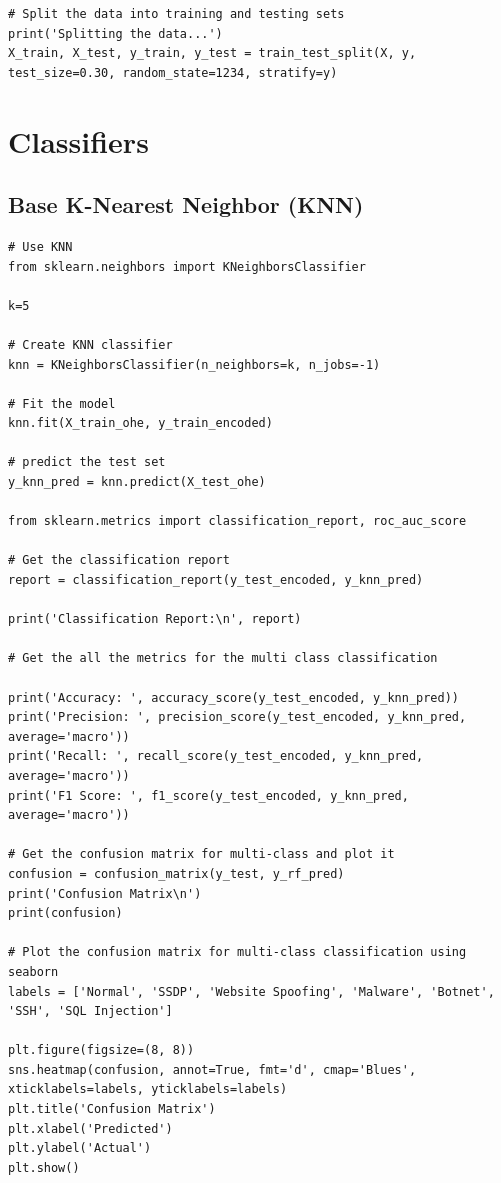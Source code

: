 \begin{appendices}
\begin{lstlisting}
# Split the data into training and testing sets
print('Splitting the data...')
X_train, X_test, y_train, y_test = train_test_split(X, y, test_size=0.30, random_state=1234, stratify=y)
\end{lstlisting}

\newpage
\section{Classifiers}
\label{appx: Classifiers}

\subsection{Base K-Nearest Neighbor (KNN)}
\begin{lstlisting}
# Use KNN
from sklearn.neighbors import KNeighborsClassifier

k=5

# Create KNN classifier
knn = KNeighborsClassifier(n_neighbors=k, n_jobs=-1)

# Fit the model
knn.fit(X_train_ohe, y_train_encoded)

# predict the test set
y_knn_pred = knn.predict(X_test_ohe)

from sklearn.metrics import classification_report, roc_auc_score

# Get the classification report
report = classification_report(y_test_encoded, y_knn_pred)

print('Classification Report:\n', report)

# Get the all the metrics for the multi class classification

print('Accuracy: ', accuracy_score(y_test_encoded, y_knn_pred))
print('Precision: ', precision_score(y_test_encoded, y_knn_pred, average='macro'))
print('Recall: ', recall_score(y_test_encoded, y_knn_pred, average='macro'))
print('F1 Score: ', f1_score(y_test_encoded, y_knn_pred, average='macro'))

# Get the confusion matrix for multi-class and plot it
confusion = confusion_matrix(y_test, y_rf_pred)
print('Confusion Matrix\n')
print(confusion)

# Plot the confusion matrix for multi-class classification using seaborn
labels = ['Normal', 'SSDP', 'Website Spoofing', 'Malware', 'Botnet', 'SSH', 'SQL Injection']

plt.figure(figsize=(8, 8))
sns.heatmap(confusion, annot=True, fmt='d', cmap='Blues', xticklabels=labels, yticklabels=labels)
plt.title('Confusion Matrix')
plt.xlabel('Predicted')
plt.ylabel('Actual')
plt.show()


\end{lstlisting}
\end{appendices}
